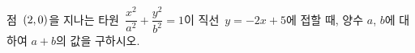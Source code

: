 점~$(2{,}\mkern3mu\mathopen{}0)$을 지나는 타원~$\dfrac{x^2}{a^2}+\dfrac{y^2}{b^2}=1$이 직선~$y=-2x+5$에 접할 때, 양수 $a$, $b$에 대하여 $a+b$의 값을 구하시오.
